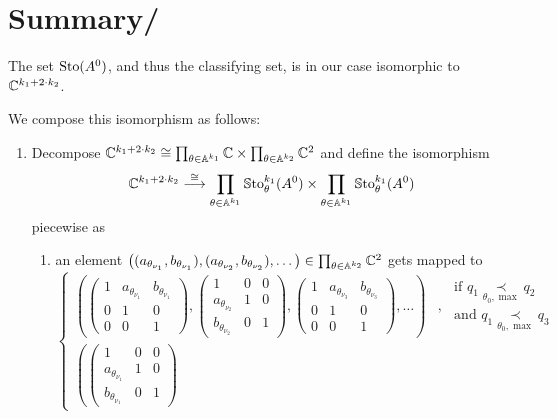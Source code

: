 \section{Summary/\TODO{}}
\begin{thm}
  The set $\operatorname{Sto}(A^0)$, and thus the classifying set, is in our case isomorphic
  to $\mathbb{C}^{k_1+2\cdot k_2}$.
\end{thm}
We compose this isomorphism as follows:
\begin{enumerate}
  \item Decompose $\mathbb{C}^{k_1+2\cdot k_2}\cong
    \prod_{\theta\in\mathbb{A}^{k_1}} \mathbb{C} \times \prod_{\theta\in\mathbb{A}^{k_2}} \mathbb{C}^2$ and
    define the isomorphism
    \[
      \mathbb{C}^{k_1+2\cdot k_2}\overset{\cong}\longrightarrow
      \prod_{\theta\in\mathbb{A}^{k_1}} \operatorname{\mathbb{S}to}_{\theta}^{k_1}(A^0) \times
      \prod_{\theta\in\mathbb{A}^{k_1}} \operatorname{\mathbb{S}to}_{\theta}^{k_1}(A^0)
    \]
    piecewise as
    \begin{enumerate}
      \item an element
        $\left( (a_{\theta_{\nu_1}},b_{\theta_{\nu_1}})
          ,(a_{\theta_{\nu_2}},b_{\theta_{\nu_2}})
          ,\dots
        \right)\in\prod_{\theta\in\mathbb{A}^{k_2}} \mathbb{C}^2$
        gets mapped to
        \[
          \left.
          \begin{cases}
            \left(
            \begin{pmatrix} 1 & a_{\theta_{\nu_1}} & b_{\theta_{\nu_1}} \\0 & 1 & 0 \\0 & 0 & 1 \end{pmatrix}
            ,\begin{pmatrix} 1 & 0 & 0 \\a_{\theta_{\nu_2}} & 1 & 0 \\b_{\theta_{\nu_2}} & 0 & 1 \end{pmatrix}
            ,\begin{pmatrix} 1 & a_{\theta_{\nu_3}} & b_{\theta_{\nu_3}} \\0 & 1 & 0 \\0 & 0 & 1 \end{pmatrix}
              ,\dots
            \right)
            & ,\substack{\text{~if~} q_1 \underset{\theta_0,\max}{\prec} q_2
              \\\text{~and~} q_1 \underset{\theta_0,\max}{\prec} q_3}
            \\\left(
            \begin{pmatrix} 1 & 0 & 0 \\a_{\theta_{\nu_1}} & 1 & 0 \\b_{\theta_{\nu_1}} & 0 & 1 \end{pmatrix}

\end{cases}\]
\end{enumerate}
\end{enumerate}
